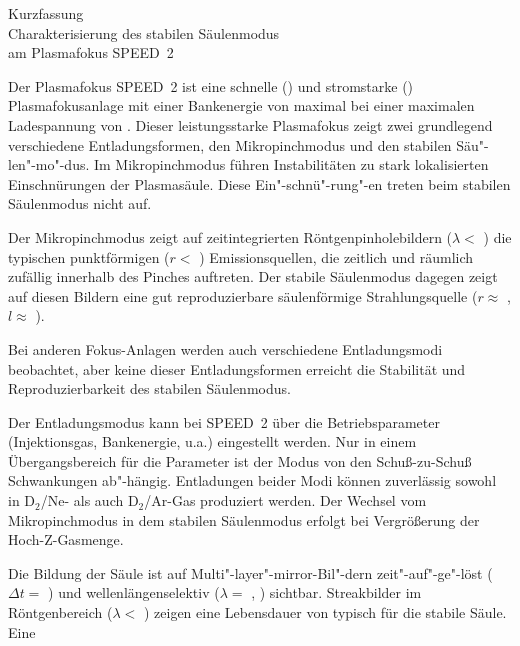 %
%
  \setcounter{page}{5}
  \pagestyle{freeheadings}
%
\begin{center}
  {\sc Kurzfassung\\
       Charakterisierung des stabilen Säulenmodus\\
       am Plasmafokus SPEED~2}\\
\end{center}
%
\par
Der Plasmafokus SPEED~2 ist eine schnelle () und stromstarke () Plasmafokusanlage
mit einer Bankenergie von maximal  bei einer
maximalen Ladespannung von . Dieser leistungsstarke
Plasmafokus zeigt zwei grundlegend verschiedene Entladungsformen,
den Mikropinchmodus und den stabilen Säu"-len"-mo"-dus. Im
Mikropinchmodus führen Instabilitäten zu stark lokalisierten
Einschnürungen der Plasmasäule. Diese Ein"-schnü"-rung"-en treten
beim stabilen Säulenmodus nicht auf.
\par
Der Mikropinchmodus zeigt auf zeitintegrierten
Röntgenpinholebildern ($\lambda <$ ) die typischen
punktförmigen ($r <$ ) Emissionsquellen, die
zeitlich und räumlich zufällig innerhalb des Pinches auftreten.
Der stabile Säulenmodus dagegen zeigt auf diesen Bildern eine gut
reproduzierbare säulenförmige Strahlungsquelle ($r \approx$
, $l \approx$ ).
\par
Bei anderen Fokus-Anlagen werden auch verschiedene Entladungsmodi
beobachtet, aber keine dieser Entladungsformen erreicht die Stabilität
und Reproduzierbarkeit des stabilen Säulenmodus.
\par
Der Entladungsmodus kann bei SPEED~2 über die Betriebsparameter
(Injektionsgas, Bankenergie, u.a.) eingestellt werden. Nur in
einem Übergangsbereich für die Parameter ist der Modus von den
Schuß-zu-Schuß Schwankungen ab"-hängig. Entladungen beider Modi
können zuverlässig sowohl in D$_2$/Ne- als auch D$_2$/Ar-Gas
produziert werden. Der Wechsel vom Mikropinchmodus in dem stabilen
Säulenmodus erfolgt bei Vergrößerung der Hoch-Z-Gasmenge.
\par
Die Bildung der Säule ist auf Multi"-layer"-mirror-Bil"-dern
zeit"-auf"-ge"-löst ($\Delta t =$ ) und
wellenlängenselektiv ($\lambda =$ ,
) sichtbar. Streakbilder
im Röntgenbereich ($\lambda <$ ) zeigen eine
Lebensdauer von typisch  für die stabile Säule. Eine
